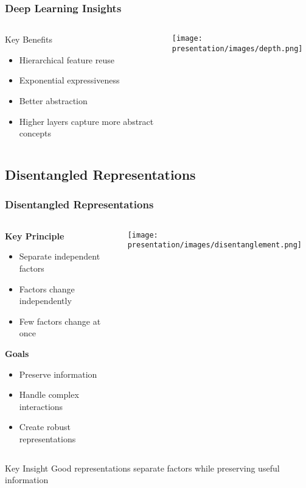 \documentclass{beamer}
\begin{document}
\begin{frame}
\frametitle{Deep Learning Insights}
\begin{columns}
    \begin{column}{0.5\textwidth}
        \begin{block}{Key Benefits}
        \begin{itemize}
        \item Hierarchical feature reuse
        \item Exponential expressiveness
        \item Better abstraction
        \item Higher layers capture more abstract concepts
        \end{itemize}
        \end{block}
    \end{column}
    
    \begin{column}{0.5\textwidth}
        \texttt{[image: presentation/images/depth.png]}
    \end{column}
\end{columns}
\end{frame}

\subsection{Disentangled Representations}

\begin{frame}
\frametitle{Disentangled Representations}
\begin{columns}
    \begin{column}{0.6\textwidth}
        \textbf{Key Principle}
        \begin{itemize}
        \item Separate independent factors
        \item Factors change independently
        \item Few factors change at once
        \end{itemize}
        
        \textbf{Goals}
        \begin{itemize}
        \item Preserve information
        \item Handle complex interactions
        \item Create robust representations
        \end{itemize}
    \end{column}
    \pause

    \begin{column}{0.4\textwidth}
        \texttt{[image: presentation/images/disentanglement.png]}
    \end{column}
\end{columns}

\begin{alertblock}{Key Insight}
Good representations separate factors while preserving useful information
\end{alertblock}
\end{frame}
\end{document}
